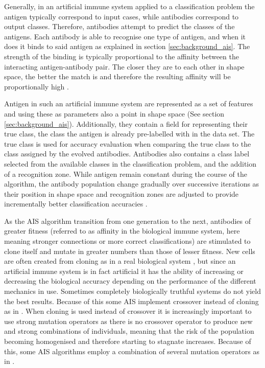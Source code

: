 Generally, in an artificial immune system applied to a classification problem the antigen typically correspond to input cases, while antibodies correspond to output classes. Therefore, antibodies attempt to predict the classes of the antigens. Each antibody is able to recognise one type of antigen, and when it does it binds to said antigen as explained in section \ref{sec:background_ais}. The strength of the binding is typically proportional to the affinity between the interacting antigen-antibody pair. The closer they are to each other in shape space, the better the match is and therefore the resulting affinity will be proportionally high \cite{AIS:Timmis2004}.

Antigen in such an artificial immune system are represented as a set of features and using these as parameters also a point in shape space (See section \ref{sec:background_ais}). Additionally, they contain a field for representing their true class, the class the antigen is already pre-labelled with in the data set. The true class is used for accuracy evaluation when comparing the true class to the class assigned by the evolved antibodies. Antibodies also contains a class label selected from the available classes in the classification problem, and the addition of a recognition zone. While antigen remain constant during the course of the algorithm, the antibody population change gradually over successive iterations as their position in shape space and recognition zones are adjusted to provide incrementally better classification accuracies \cite{AIS:Timmis2004}. 

As the AIS algorithm transition from one generation to the next, antibodies of greater fitness (referred to as affinity in the biological immune system, here meaning stronger connections or more correct classifications) are stimulated to clone itself and mutate in greater numbers than those of lesser fitness. New cells are often created from cloning as in a real biological system \cite{AIS:ClonalSelection}, but since an artificial immune system is in fact artificial it has the ability of increasing or decreasing the biological accuracy depending on the performance of the different mechanics in use. Sometimes completely biologically truthful systems do not yield the best results. Because of this some AIS implement crossover instead of cloning as in \cite{process:valis}. When cloning is used instead of crossover it is increasingly important to use strong mutation operators as there is no crossover operator to produce new and strong combinations of individuals, meaning that the risk of the population becoming homogenised and therefore starting to stagnate increases. Because of this, some AIS algorithms employ a combination of several mutation operators as in \cite{AIS:elipsis}. 

